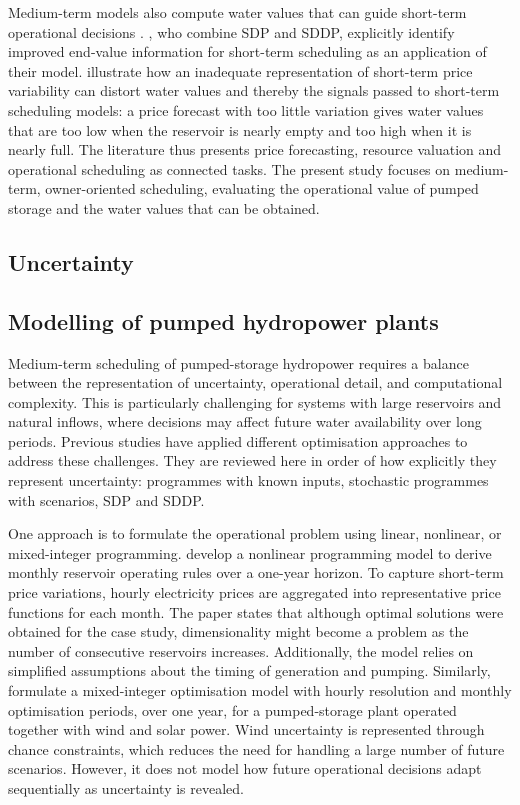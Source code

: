 Medium-term models also compute water values that can guide short-term operational decisions \parencite{helseth2016, helseth2020scheduling}. \textcite{helseth2016}, who combine SDP and SDDP, explicitly identify improved end-value information for short-term scheduling as an application of their model. \textcite{helseth2020scheduling} illustrate how an inadequate representation of short-term price variability can distort water values and thereby the signals passed to short-term scheduling models: a price forecast with too little variation gives water values that are too low when the reservoir is nearly empty and too high when it is nearly full. The literature thus presents price forecasting, resource valuation and operational scheduling as connected tasks. The present study focuses on medium-term, owner-oriented scheduling, evaluating the operational value of pumped storage and the water values that can be obtained.


\subsection{Uncertainty}



\subsection{Modelling of pumped hydropower plants}

Medium-term scheduling of pumped-storage hydropower requires a balance between the representation of uncertainty, operational detail, and computational complexity. This is particularly challenging for systems with large reservoirs and natural inflows, where decisions may affect future water availability over long periods. Previous studies have applied different optimisation approaches to address these challenges. They are reviewed here in order of how explicitly they represent uncertainty: programmes with known inputs, stochastic programmes with scenarios, SDP and SDDP.

One approach is to formulate the operational problem using linear, nonlinear, or mixed-integer programming. \textcite{ak2019} %
develop a nonlinear programming model to derive monthly reservoir operating rules over a one-year horizon. To capture short-term price variations, hourly electricity prices are aggregated into representative price functions for each month. The paper states that although optimal solutions were obtained for the case study, dimensionality might become a problem as the number of consecutive reservoirs increases. Additionally, the model relies on simplified assumptions about the timing of generation and pumping. Similarly, \textcite{naval2025} %
formulate a mixed-integer optimisation model with hourly resolution and monthly optimisation periods, over one year, for a pumped-storage plant operated together with wind and solar power. Wind uncertainty is represented through chance constraints, which reduces the need for handling a large number of future scenarios. However, it does not model how future operational decisions adapt sequentially as uncertainty is revealed.

